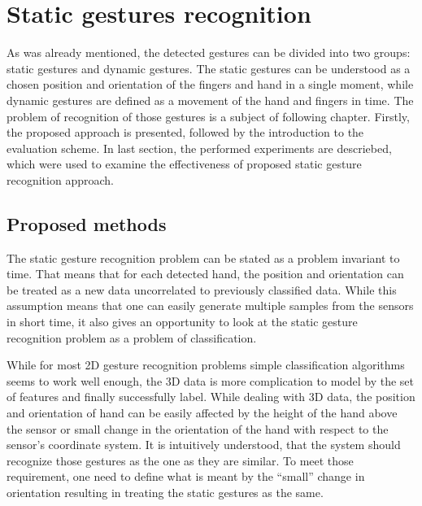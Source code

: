
\chapter{Static gestures recognition}

As was already mentioned, the detected gestures can be divided into two groups: static gestures and dynamic gestures.
The static gestures can be understood as a chosen position and orientation of the fingers and hand in a single moment, while dynamic gestures are defined as a movement of the hand and fingers in time. 
The problem of recognition of those gestures is a subject of following chapter. 
Firstly, the proposed approach is presented, followed by the introduction to the evaluation scheme. 
In last section, the performed experiments are descriebed, which were used to examine the effectiveness of proposed static gesture recognition approach.

\section{Proposed methods}

The static gesture recognition problem can be stated as a problem invariant to time.
That means that for each detected hand, the position and orientation can be treated as a new data uncorrelated to previously classified data.
While this assumption means that one can easily generate multiple samples from the sensors in short time, it also gives an opportunity to look at the static gesture recognition problem as a problem of classification.

While for most 2D gesture recognition problems simple classification algorithms seems to work well enough, the 3D data is more complication to model by the set of features and finally successfully label.
While dealing with 3D data, the position and orientation of hand can be easily affected by the height of the hand above the sensor or small change in the orientation of the hand with respect to the sensor's coordinate system. 
It is intuitively understood, that the system should recognize those gestures as the one as they are similar.
To meet those requirement, one need to define what is meant by the ``small'' change in orientation resulting in treating the static gestures as the same.

